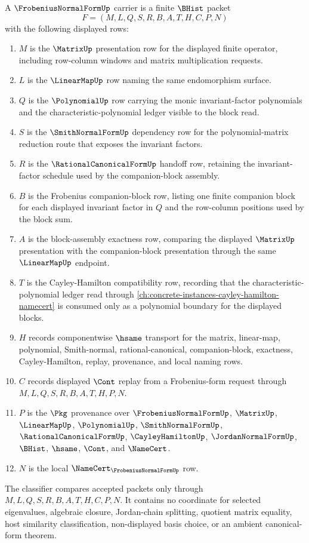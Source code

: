 \begin{definition}
\label{def:frobenius-normal-form-carrier}
A $\FrobeniusNormalFormUp$ carrier is a finite $\BHist$ packet
$$
F=(M,L,Q,S,R,B,A,T,H,C,P,N)
$$
with the following displayed rows:
\begin{enumerate}
\item $M$ is the $\MatrixUp$ presentation row for the displayed finite operator, including row-column windows and matrix multiplication requests.
\item $L$ is the $\LinearMapUp$ row naming the same endomorphism surface.
\item $Q$ is the $\PolynomialUp$ row carrying the monic invariant-factor polynomials and the characteristic-polynomial ledger visible to the block read.
\item $S$ is the $\SmithNormalFormUp$ dependency row for the polynomial-matrix reduction route that exposes the invariant factors.
\item $R$ is the $\RationalCanonicalFormUp$ handoff row, retaining the invariant-factor schedule used by the companion-block assembly.
\item $B$ is the Frobenius companion-block row, listing one finite companion block for each displayed invariant factor in $Q$ and the row-column positions used by the block sum.
\item $A$ is the block-assembly exactness row, comparing the displayed $\MatrixUp$ presentation with the companion-block presentation through the same $\LinearMapUp$ endpoint.
\item $T$ is the Cayley-Hamilton compatibility row, recording that the characteristic-polynomial ledger read through \autoref{ch:concrete-instances-cayley-hamilton-namecert} is consumed only as a polynomial boundary for the displayed blocks.
\item $H$ records componentwise $\hsame$ transport for the matrix, linear-map, polynomial, Smith-normal, rational-canonical, companion-block, exactness, Cayley-Hamilton, replay, provenance, and local naming rows.
\item $C$ records displayed $\Cont$ replay from a Frobenius-form request through $M,L,Q,S,R,B,A,T,H,P,N$.
\item $P$ is the $\Pkg$ provenance over $\FrobeniusNormalFormUp$, $\MatrixUp$, $\LinearMapUp$, $\PolynomialUp$, $\SmithNormalFormUp$, $\RationalCanonicalFormUp$, $\CayleyHamiltonUp$, $\JordanNormalFormUp$, $\BHist$, $\hsame$, $\Cont$, and $\NameCert$.
\item $N$ is the local $\NameCert_{\FrobeniusNormalFormUp}$ row.
\end{enumerate}
The classifier compares accepted packets only through $M,L,Q,S,R,B,A,T,H,C,P,N$. It contains no coordinate for selected eigenvalues, algebraic closure, Jordan-chain splitting, quotient matrix equality, host similarity classification, non-displayed basis choice, or an ambient canonical-form theorem.
\end{definition}

